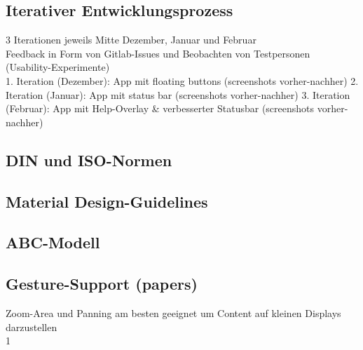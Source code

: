   \subsection{Iterativer Entwicklungsprozess}
    3 Iterationen jeweils Mitte Dezember, Januar und Februar \\
    Feedback in Form von Gitlab-Issues und Beobachten von Testpersonen (Usability-Experimente) \\
    1. Iteration (Dezember): App mit floating buttons (screenshots vorher-nachher)
    2. Iteration (Januar): App mit status bar (screenshots vorher-nachher)
    3. Iteration (Februar): App mit Help-Overlay \& verbesserter Statusbar (screenshots vorher-nachher)
  \subsection{DIN und ISO-Normen}
  \subsection{Material Design-Guidelines}
  \subsection{ABC-Modell}
  \subsection{Gesture-Support (papers)}
    Zoom-Area und Panning am besten geeignet um Content auf kleinen Displays darzustellen \\


  
1